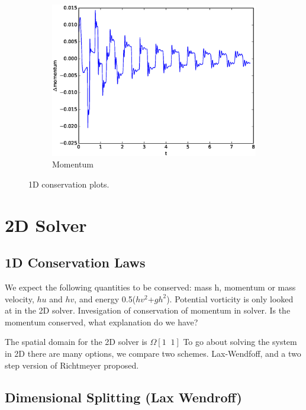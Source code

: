 \begin{figure}[htp]
\begin{subfigure}[b]{0.32\textwidth}
        \centering
        \includegraphics[width=\textwidth]{images/Mo1d.eps}\hfill
        \caption{Momentum}
        \label{Momentum}
    \end{subfigure}
    \caption{1D conservation plots.}
    \label{fig:three graphs}
\end{figure}

\section{2D Solver}
\subsection{1D Conservation Laws}
We expect the following quantities to be conserved: mass h, momentum or mass velocity, $hu$ and $hv$, and
energy 0.5($hv^2$+$gh^2$). Potential vorticity is only looked at in the 2D solver. Invesigation of conservation of momentum in solver.
 Is the momentum conserved, what explanation do we have?

The spatial domain for the 2D solver is $\Omega [1\;\;1]$ To go about solving the system in 2D there are many options,
we compare two schemes. Lax-Wendfoff, and a two step version of Richtmeyer proposed. \newline
\newline

\subsection{Dimensional Splitting (Lax Wendroff)}

